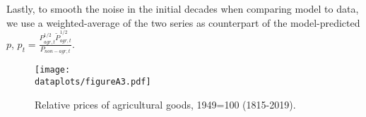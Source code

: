 \documentclass[11pt]{report}
\newcommand{\dataplots}{../output/data/plots}
\begin{document}
Lastly, to smooth the noise in the initial decades when comparing model to data, we use a weighted-average of the two series as counterpart of the model-predicted $p$, $p_t=\frac{P_{agr,t}^{1/2}\tilde{P}_{agr,t}^{1/2}}{P_{non-agr,t}}$.

\begin{figure}
	\begin{center}
		\texttt{[image: \\dataplots/figureA3.pdf]}
	\end{center}
	\vspace{-0.5cm}
	\caption{Relative prices of agricultural goods, 1949=100 (1815-2019).}
	\label{A-fig:relpriceagri}
\end{figure}

\end{document}
